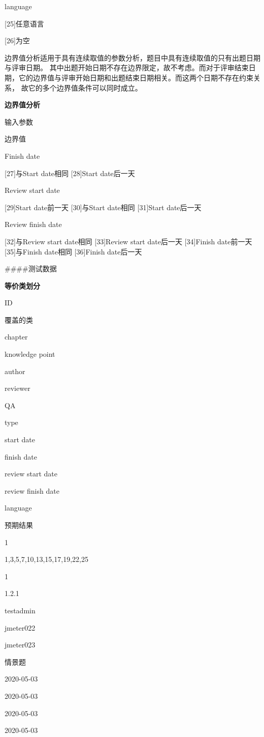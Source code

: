 \documentclass[hyperref, a4paper]{ctexart}
\begin{document}
language

{[}25{]}任意语言

{[}26{]}为空

边界值分析适用于具有连续取值的参数分析，题目中具有连续取值的只有出题日期与评审日期。
其中出题开始日期不存在边界限定，故不考虑。而对于评审结束日期，它的边界值与评审开始日期和出题结束日期相关。而这两个日期不存在约束关系，
故它的多个边界值条件可以同时成立。

\textbf{边界值分析}

输入参数

边界值

Finish date

{[}27{]}与Start date相同 {[}28{]}Start date后一天

Review start date

{[}29{]}Start date前一天 {[}30{]}与Start date相同 {[}31{]}Start
date后一天

Review finish date

{[}32{]}与Review start date相同 {[}33{]}Review start date后一天
{[}34{]}Finish date前一天 {[}35{]}与Finish date相同 {[}36{]}Finish
date后一天

\#\#\#\#测试数据

\textbf{等价类划分}

ID

覆盖的类

chapter

knowledge point

author

reviewer

QA

type

start date

finish date

review start date

review finish date

language

预期结果

1

1,3,5,7,10,13,15,17,19,22,25

1

1.2.1

testadmin

jmeter022

jmeter023

情景题

2020-05-03

2020-05-03

2020-05-03

2020-05-03
\end{document}

